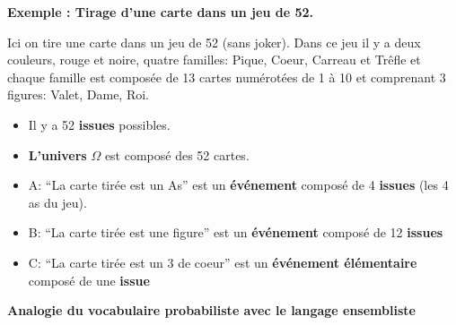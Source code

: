 \documentclass[a4paper]{report}
\theoremstyle{break}
\newcounter{exem}
\newcommand{\exemple}[1]{\textbf{Exemple \theexem: #1} \addtocounter{exem}{1} }
\begin{document}
\exemple{Tirage d'une carte dans un jeu de 52.}

Ici on tire une carte dans un jeu de 52 (sans joker). Dans ce jeu il y a deux
couleurs, rouge et noire, quatre familles: Pique, Coeur, Carreau et Trêfle et
chaque famille est composée de 13 cartes numérotées de 1 à 10 et comprenant 3
figures: Valet, Dame, Roi.
\begin{itemize}[label = $\bullet$, leftmargin=1cm]
\item Il y a 52 \textbf{issues} possibles.
\item \textbf{L'univers} $\Omega$ est composé des 52 cartes.
\item A: ``La carte tirée est un As'' est un \textbf{événement} composé de 4 \textbf{issues} (les
  4 as du jeu).
\item B: ``La carte tirée est une figure'' est un \textbf{événement} composé de
  12 \textbf{issues}
\item C: ``La carte tirée est un 3 de coeur'' est un \textbf{événement élémentaire} composé de
  une \textbf{issue}
\end{itemize}

\vspace{1\baselineskip}

\textbf{Analogie du vocabulaire probabiliste avec le langage ensembliste}
\end{document}
